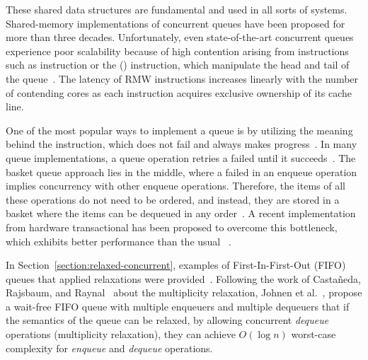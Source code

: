 These shared data structures are fundamental and used in all sorts of systems. Shared-memory implementations of concurrent queues have been proposed for more than three decades. Unfortunately, even state-of-the-art concurrent queues experience poor scalability because of high contention arising from \RMW instructions such as \CAS instruction or the (\FAI) instruction, which manipulate the head and tail of the queue~\cite{DBLP_conf_spaa_FatourouK11, DBLP_conf_ppopp_FatourouK12, basketqueue2007, DBLP_conf_ppopp_KoganP11, DBLP_journals_dc_Ladan-MozesS08, DBLP_conf_podc_MichaelS96, DBLP_journals_topc_Milman-SelaKLLP22, DBLP_conf_ppopp_YangM16}. The latency of RMW instructions increases linearly with the number of contending cores as each instruction acquires exclusive ownership of its cache line.

One of the most popular ways to implement a queue is by utilizing the meaning behind the \FAI instruction, which does not fail and always makes progress~\cite{ppopp2013x86queues, DBLP_conf_ppopp_YangM16}. In many queue implementations, a queue operation retries a failed \CAS until it succeeds~\cite{DBLP_conf_spaa_FatourouK11, DBLP_conf_ppopp_FatourouK12, basketqueue2007, DBLP_conf_ppopp_KoganP11, DBLP_journals_dc_Ladan-MozesS08, DBLP_conf_ppopp_YangM16}. The basket queue approach lies in the middle, where a failed \CAS in an enqueue operation implies concurrency with other enqueue operations. Therefore, the items of all these operations do not need to be ordered, and instead, they are stored in a basket where the items can be dequeued in any order~\cite{basketqueue2007}. A recent \CAS implementation from hardware transactional has been proposed to overcome this bottleneck, which exhibits better performance than the usual \CAS~\cite{scalingconcurrent2020}.

In Section~\ref{section:relaxed-concurrent}, examples of First-In-First-Out (FIFO) queues that applied relaxations were provided~\cite{DBLP_conf_cf_HaasLHPSKS13, DBLP_conf_pact_KirschLP13, DBLP_conf_ica3pp_KirschPRS12}. Following the work of Castañeda, Rajsbaum, and Raynal~\cite{DBLP_conf_opodis_CastanedaRR20} about the multiplicity relaxation, Johnen et al.~\cite{DBLP_conf_opodis_JohnenKM22}, propose a wait-free FIFO queue with multiple enqueuers and multiple dequeuers that if the semantics of the queue can be relaxed, by allowing concurrent \emph{dequeue} operations (multiplicity relaxation), they can achieve \(O(\log{n})\) worst-case complexity for \emph{enqueue} and \emph{dequeue} operations.

